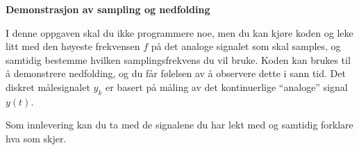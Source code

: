 
\item
    {\bf Demonstrasjon av sampling og nedfolding}

  I denne oppgaven skal du ikke programmere noe, men du kan kjøre
  koden og leke litt med den høyeste frekvensen $f$ på det analoge
  signalet som
  skal samples, og samtidig bestemme hvilken samplingsfrekvens du vil bruke. Koden
  kan brukes til å demonstrere nedfolding, og du får følelsen av å
  observere dette i sann tid.  Det diskret målesignalet $y_{k}$ er
  basert på måling av det kontinuerlige ``analoge'' signal $y(t)$.

Som innlevering kan du ta med de signalene du har lekt med og samtidig
forklare hva som skjer.



